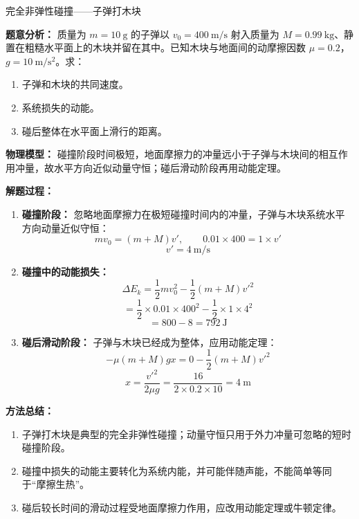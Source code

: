\begin{examplebox}{完全非弹性碰撞——子弹打木块}

\textbf{题意分析：} 质量为 $m = 10\ \mathrm{g}$ 的子弹以 $v_0 = 400\ \mathrm{m/s}$ 射入质量为 $M = 0.99\ \mathrm{kg}$、静置在粗糙水平面上的木块并留在其中。已知木块与地面间的动摩擦因数 $\mu = 0.2$，$g = 10\ \mathrm{m/s^2}$。求：
\begin{enumerate}
  \item 子弹和木块的共同速度。
  \item 系统损失的动能。
  \item 碰后整体在水平面上滑行的距离。
\end{enumerate}

\textbf{物理模型：} 碰撞阶段时间极短，地面摩擦力的冲量远小于子弹与木块间的相互作用冲量，故水平方向近似动量守恒；碰后滑动阶段再用动能定理。

\begin{center}


\label{fig:bullet-block-stages}
\end{center}

\textbf{解题过程：}

\begin{enumerate}
  \item \textbf{碰撞阶段：} 忽略地面摩擦力在极短碰撞时间内的冲量，子弹与木块系统水平方向动量近似守恒：
  \[
  m v_0 = (m + M) v',\qquad 0.01 \times 400 = 1 \times v'
  \]
  \[
  v' = 4\ \mathrm{m/s}
  \]

  \item \textbf{碰撞中的动能损失：}
  \[
  \Delta E_k = \frac12 m v_0^2 - \frac12 (m+M) v'^2
  \]
  \[
  = \frac12 \times 0.01 \times 400^2 - \frac12 \times 1 \times 4^2
  \]
  \[
  = 800 - 8 = 792\ \mathrm{J}
  \]

  \item \textbf{碰后滑动阶段：} 子弹与木块已经成为整体，应用动能定理：
  \[
  -\mu (m+M) g x = 0 - \frac12 (m+M) v'^2
  \]
  \[
  x = \frac{v'^2}{2\mu g} = \frac{16}{2 \times 0.2 \times 10} = 4\ \mathrm{m}
  \]
\end{enumerate}

\textbf{方法总结：}
\begin{enumerate}
  \item 子弹打木块是典型的完全非弹性碰撞；动量守恒只用于外力冲量可忽略的短时碰撞阶段。
  \item 碰撞中损失的动能主要转化为系统内能，并可能伴随声能，不能简单等同于“摩擦生热”。
  \item 碰后较长时间的滑动过程受地面摩擦力作用，应改用动能定理或牛顿定律。
\end{enumerate}

\end{examplebox}

